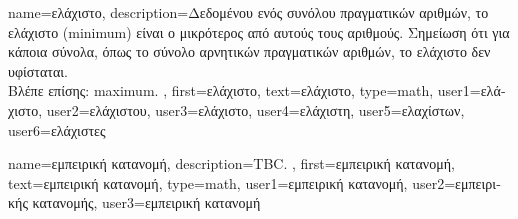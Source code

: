 {name={\foreignlanguage{greek}{ελάχιστο}},
	description={\foreignlanguage{greek}{Δεδομένου ενός συνόλου πραγματικών αριθμών,} 
		\foreignlanguage{greek}{το ελάχιστο} (minimum) \foreignlanguage{greek}{είναι ο μικρότερος από αυτούς τους αριθμούς. Σημείωση ότι 
		για κάποια σύνολα, όπως το σύνολο αρνητικών πραγματικών αριθμών, το ελάχιστο δεν υφίσταται.} 
		\\
		\foreignlanguage{greek}{Βλέπε επίσης:} \gls{maximum}. },
	first={\foreignlanguage{greek}{ελάχιστο}},
	text={\foreignlanguage{greek}{ελάχιστο}},
	type=math,
	user1={\foreignlanguage{greek}{ελάχιστο}}, %
	user2={\foreignlanguage{greek}{ελάχιστου}}, %
	user3={\foreignlanguage{greek}{ελάχιστο}}, %
	user4={\foreignlanguage{greek}{ελάχιστη}}, %
	user5={\foreignlanguage{greek}{ελαχίστων}}, %
	user6={\foreignlanguage{greek}{ελάχιστες}} %
}

{name={\foreignlanguage{greek}{εμπειρική κατανομή}},
	description={TBC. },
	first={\foreignlanguage{greek}{εμπειρική κατανομή}},
	text={\foreignlanguage{greek}{εμπειρική κατανομή}},
    	type=math,
	user1={\foreignlanguage{greek}{εμπειρική κατανομή}}, %
  	user2={\foreignlanguage{greek}{εμπειρικής κατανομής}}, %
	user3={\foreignlanguage{greek}{εμπειρική κατανομή}} %
}

